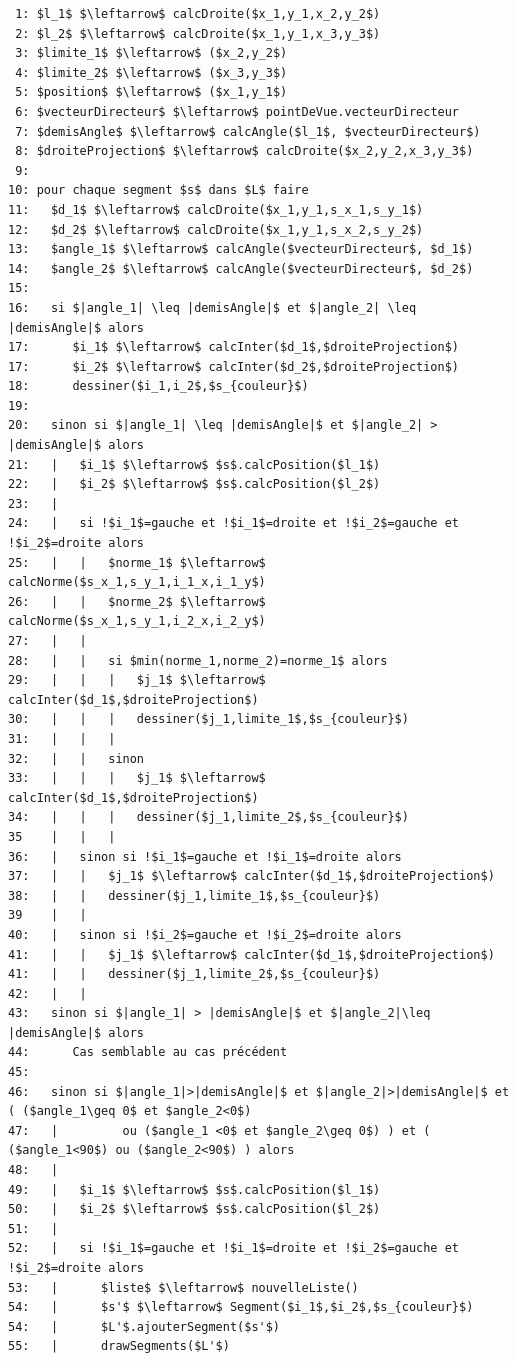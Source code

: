 \documentclass[11pt,a4paper]{article}
\theoremstyle{definition}
\theoremstyle{remark}
\begin{document}
\newpage

\begin{lstlisting}
 1: $l_1$ $\leftarrow$ calcDroite($x_1,y_1,x_2,y_2$)
 2: $l_2$ $\leftarrow$ calcDroite($x_1,y_1,x_3,y_3$)
 3: $limite_1$ $\leftarrow$ ($x_2,y_2$)
 4: $limite_2$ $\leftarrow$ ($x_3,y_3$)
 5: $position$ $\leftarrow$ ($x_1,y_1$)
 6: $vecteurDirecteur$ $\leftarrow$ pointDeVue.vecteurDirecteur
 7: $demisAngle$ $\leftarrow$ calcAngle($l_1$, $vecteurDirecteur$)
 8: $droiteProjection$ $\leftarrow$ calcDroite($x_2,y_2,x_3,y_3$)
 9: 
10: pour chaque segment $s$ dans $L$ faire
11:   $d_1$ $\leftarrow$ calcDroite($x_1,y_1,s_x_1,s_y_1$)
12:   $d_2$ $\leftarrow$ calcDroite($x_1,y_1,s_x_2,s_y_2$)
13:   $angle_1$ $\leftarrow$ calcAngle($vecteurDirecteur$, $d_1$)
14:   $angle_2$ $\leftarrow$ calcAngle($vecteurDirecteur$, $d_2$)
15:
16:   si $|angle_1| \leq |demisAngle|$ et $|angle_2| \leq |demisAngle|$ alors
17:      $i_1$ $\leftarrow$ calcInter($d_1$,$droiteProjection$)
17:      $i_2$ $\leftarrow$ calcInter($d_2$,$droiteProjection$)
18:      dessiner($i_1,i_2$,$s_{couleur}$)
19:
20:   sinon si $|angle_1| \leq |demisAngle|$ et $|angle_2| > |demisAngle|$ alors
21:   |   $i_1$ $\leftarrow$ $s$.calcPosition($l_1$)
22:   |   $i_2$ $\leftarrow$ $s$.calcPosition($l_2$)
23:   |
24:   |   si !$i_1$=gauche et !$i_1$=droite et !$i_2$=gauche et !$i_2$=droite alors
25:   |   |   $norme_1$ $\leftarrow$ calcNorme($s_x_1,s_y_1,i_1_x,i_1_y$)
26:   |   |   $norme_2$ $\leftarrow$ calcNorme($s_x_1,s_y_1,i_2_x,i_2_y$)
27:   |   |   
28:   |   |   si $min(norme_1,norme_2)=norme_1$ alors
29:   |   |   |   $j_1$ $\leftarrow$ calcInter($d_1$,$droiteProjection$)
30:   |   |   |   dessiner($j_1,limite_1$,$s_{couleur}$)
31:   |   |   |
32:   |   |   sinon
33:   |   |   |   $j_1$ $\leftarrow$ calcInter($d_1$,$droiteProjection$)
34:   |   |   |   dessiner($j_1,limite_2$,$s_{couleur}$)
35    |   |   |
36:   |   sinon si !$i_1$=gauche et !$i_1$=droite alors
37:   |   |   $j_1$ $\leftarrow$ calcInter($d_1$,$droiteProjection$)
38:   |   |   dessiner($j_1,limite_1$,$s_{couleur}$)
39    |   |
40:   |   sinon si !$i_2$=gauche et !$i_2$=droite alors
41:   |   |   $j_1$ $\leftarrow$ calcInter($d_1$,$droiteProjection$)
41:   |   |   dessiner($j_1,limite_2$,$s_{couleur}$)
42:   |   |
43:   sinon si $|angle_1| > |demisAngle|$ et $|angle_2|\leq |demisAngle|$ alors
44:      Cas semblable au cas précédent
45:
46:   sinon si $|angle_1|>|demisAngle|$ et $|angle_2|>|demisAngle|$ et ( ($angle_1\geq 0$ et $angle_2<0$)
47:   |         ou ($angle_1 <0$ et $angle_2\geq 0$) ) et ( ($angle_1<90$) ou ($angle_2<90$) ) alors
48:   |
49:   |   $i_1$ $\leftarrow$ $s$.calcPosition($l_1$)
50:   |   $i_2$ $\leftarrow$ $s$.calcPosition($l_2$)
51:   |
52:   |   si !$i_1$=gauche et !$i_1$=droite et !$i_2$=gauche et !$i_2$=droite alors
53:   |      $liste$ $\leftarrow$ nouvelleListe()
54:   |      $s'$ $\leftarrow$ Segment($i_1$,$i_2$,$s_{couleur}$)
54:   |      $L'$.ajouterSegment($s'$)
55:   |      drawSegments($L'$)
\end{lstlisting}
\restoregeometry
\end{document}
